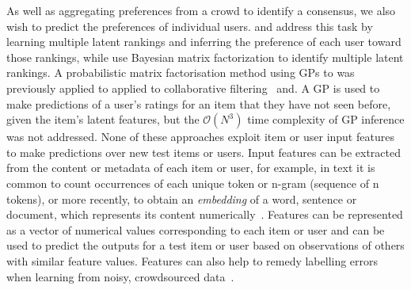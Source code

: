 As well as aggregating preferences from a crowd to identify a consensus,
we also wish to predict the preferences of individual users.
\citet{yi_inferring_2013} and \citet{kim2014latent} address this task by learning
 multiple latent rankings and inferring
the preference of each user toward those rankings, while 
\citet{salimans2012collaborative} use Bayesian matrix factorization to identify multiple
latent rankings.
A probabilistic matrix factorisation method using GPs to
was previously applied to  applied to collaborative filtering~\citep{lawrence2009non} and.
A GP is used to make predictions of a user's ratings for an item that they have not seen before, given the
item's latent features, but the $\mathcal{O}(N^3)$ time complexity of GP inference was not addressed.
None of these approaches exploit item or user 
input features to make predictions over new test items or users. %
Input features can be extracted from the content or metadata of each item or user, for example, in text 
it is common to count occurrences of each unique token or n-gram (sequence of n tokens),
or more recently, to obtain an \emph{embedding} of a word, sentence or document,
which represents its content numerically~\citep{mikolov2013distributed,devlin2018bert}.
Features can be represented as a vector of numerical values corresponding to each item or user
and can be used to predict the outputs for a test item or user based on observations of others with similar feature values.
Features can also help to remedy labelling errors when learning from noisy, crowdsourced data~\citep{felt2016semantic,simpson2015language}.


